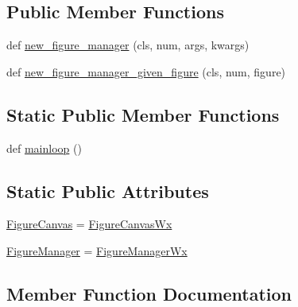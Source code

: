 \subsection*{Public Member Functions}
\begin{DoxyCompactItemize}
\item 
def \hyperlink{classmatplotlib_1_1backends_1_1backend__wx_1_1__BackendWx_a5bc0e5f0bb066086de388c3752f888a4}{new\+\_\+figure\+\_\+manager} (cls, num, args, kwargs)
\item 
def \hyperlink{classmatplotlib_1_1backends_1_1backend__wx_1_1__BackendWx_a707a0ba7ada806308acb6d21817b0444}{new\+\_\+figure\+\_\+manager\+\_\+given\+\_\+figure} (cls, num, figure)
\end{DoxyCompactItemize}
\subsection*{Static Public Member Functions}
\begin{DoxyCompactItemize}
\item 
def \hyperlink{classmatplotlib_1_1backends_1_1backend__wx_1_1__BackendWx_a2a52759940e8ba4f220a9972e911811e}{mainloop} ()
\end{DoxyCompactItemize}
\subsection*{Static Public Attributes}
\begin{DoxyCompactItemize}
\item 
\hyperlink{classmatplotlib_1_1backends_1_1backend__wx_1_1__BackendWx_aeabece37a6d3220eab45c84dd34cfa39}{Figure\+Canvas} = \hyperlink{classmatplotlib_1_1backends_1_1backend__wx_1_1FigureCanvasWx}{Figure\+Canvas\+Wx}
\item 
\hyperlink{classmatplotlib_1_1backends_1_1backend__wx_1_1__BackendWx_acb423d5f5e3a57edccc5f1b8ca8210ac}{Figure\+Manager} = \hyperlink{classmatplotlib_1_1backends_1_1backend__wx_1_1FigureManagerWx}{Figure\+Manager\+Wx}
\end{DoxyCompactItemize}


\subsection{Member Function Documentation}
\mbox{\label{classmatplotlib_1_1backends_1_1backend__wx_1_1__BackendWx_a2a52759940e8ba4f220a9972e911811e}} 
